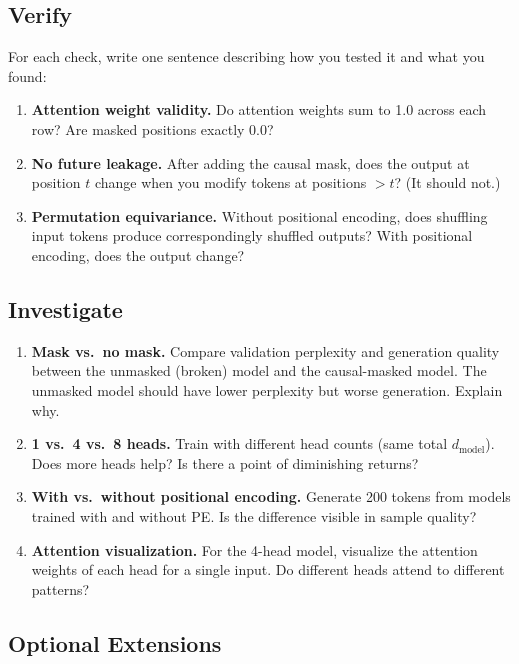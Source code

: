 \subsection*{Verify}

For each check, write one sentence describing how you tested it and what you found:

\begin{enumerate}
    \item \textbf{Attention weight validity.} Do attention weights sum to 1.0 across each row? Are masked positions exactly 0.0?
    \item \textbf{No future leakage.} After adding the causal mask, does the output at position $t$ change when you modify tokens at positions $> t$? (It should not.)
    \item \textbf{Permutation equivariance.} Without positional encoding, does shuffling input tokens produce correspondingly shuffled outputs? With positional encoding, does the output change?
\end{enumerate}

\subsection*{Investigate}

\begin{enumerate}
    \item \textbf{Mask vs.\ no mask.} Compare validation perplexity and generation quality between the unmasked (broken) model and the causal-masked model. The unmasked model should have lower perplexity but worse generation. Explain why.
    \item \textbf{1 vs.\ 4 vs.\ 8 heads.} Train with different head counts (same total $d_{\text{model}}$). Does more heads help? Is there a point of diminishing returns?
    \item \textbf{With vs.\ without positional encoding.} Generate 200 tokens from models trained with and without PE. Is the difference visible in sample quality?
    \item \textbf{Attention visualization.} For the 4-head model, visualize the attention weights of each head for a single input. Do different heads attend to different patterns?
\end{enumerate}

\subsection*{Optional Extensions}

